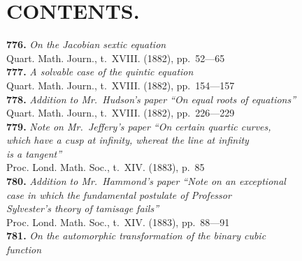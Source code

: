 \documentclass[11pt,a4paper]{book}
\begin{document}
\cleardoublepage

\chapter*{CONTENTS.}

\textbf{776.} \textit{On the Jacobian sextic equation} \\
\hspace*{2em}Quart. Math. Journ., t.~XVIII. (1882), pp.~52---65\\[0.3em]
\textbf{777.} \textit{A solvable case of the quintic equation} \\
\hspace*{2em}Quart. Math. Journ., t.~XVIII. (1882), pp.~154---157\\[0.3em]
\textbf{778.} \textit{Addition to Mr.~Hudson's paper ``On equal roots of equations''} \\
\hspace*{2em}Quart. Math. Journ., t.~XVIII. (1882), pp.~226---229\\[0.3em]
\textbf{779.} \textit{Note on Mr.~Jeffery's paper ``On certain quartic curves,}\\
\hspace*{2em}\textit{which have a cusp at infinity, whereat the line at infinity}\\
\hspace*{2em}\textit{is a tangent''} \\
\hspace*{2em}Proc. Lond. Math. Soc., t.~XIV. (1883), p.~85\\[0.3em]
\textbf{780.} \textit{Addition to Mr.~Hammond's paper ``Note on an exceptional}\\
\hspace*{2em}\textit{case in which the fundamental postulate of Professor}\\
\hspace*{2em}\textit{Sylvester's theory of tamisage fails''} \\
\hspace*{2em}Proc. Lond. Math. Soc., t.~XIV. (1883), pp.~88---91\\[0.3em]
\textbf{781.} \textit{On the automorphic transformation of the binary cubic}\\
\hspace*{2em}\textit{function} \\
\end{document}
